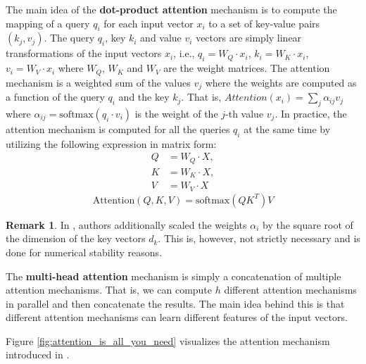 \documentclass[a4paper, twoside]{report}
\theoremstyle{definition}
\newtheorem{remark}[theorem]{Remark}
\numberwithin{equation}{section}
\begin{document}
The main idea of the \textbf{dot-product attention} mechanism is to compute the mapping of a query $q_i$ for each input vector $x_i$ to a set of key-value pairs $(k_j, v_j)$.
The query $q_i$, key $k_i$ and value $v_i$ vectors are simply linear transformations of the input vectors $x_i$,
i.e., $q_i=W_Q\cdot x_i$, $k_i=W_K\cdot x_i$, $v_i=W_V\cdot x_i$ where $W_Q$, $W_K$ and $W_V$ are the weight matrices.
The attention mechanism is a weighted sum of the values $v_j$ where the weights are computed as a function of the query $q_i$ and the key $k_j$.
That is, $Attention(x_i)=\sum_j \alpha_{ij} v_j$ where $\alpha_{ij}=\text{softmax}(q_i \cdot v_i)$ is the weight of the $j$-th value $v_j$.
In practice, the attention mechanism is computed for all the queries $q_i$ at the same time by utilizing the following expression in matrix form:
\begin{equation}
    \begin{array}{rll}
        Q & = W_Q \cdot X, \\
        K & = W_K \cdot X, \\
        V & = W_V \cdot X
    \end{array}
\end{equation}
\begin{equation}\label{eq:dot_product_attention_matrix}
    \text{Attention}(Q, K, V)=\text{softmax}(Q K^T) V
\end{equation}

\begin{remark}
    In \cite{1706.03762}, authors additionally scaled the weights $\alpha_i$ by the square root of the dimension of the key vectors $d_k$.
    This is, however, not strictly necessary and is done for numerical stability reasons.
\end{remark}

The \textbf{multi-head attention} mechanism is simply a concatenation of multiple attention mechanisms.
That is, we can compute $h$ different attention mechanisms in parallel and then concatenate the results.
The main idea behind this is that different attention mechanisms can learn different features of the input vectors.

Figure \ref{fig:attention_is_all_you_need} visualizes the attention mechanism introduced in \cite{1706.03762}.
\end{document}
